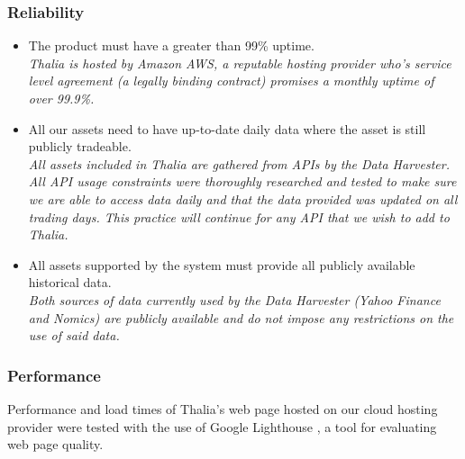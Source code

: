 \documentclass[main.tex]{subfiles}
\begin{document}
\subsubsection{Reliability}
\begin{itemize}
    
    \item The product must have a greater than 99\% uptime.\\
    \textit{Thalia is hosted by Amazon AWS, a reputable hosting provider who’s service level agreement (a legally binding contract) promises a monthly uptime of over 99.9\%\cite{amazonSLA}.}
    
    \item All our assets need to have up-to-date daily data where the asset is still publicly tradeable.\\
    \textit{All assets included in Thalia are gathered from APIs by the Data Harvester. All API usage constraints were thoroughly researched and tested to make sure we are able to access data daily and that the data provided was updated on all trading days. This practice will continue for any API that we wish to add to Thalia.}
    
    \item All assets supported by the system must provide all publicly available historical data.\\
    \textit{Both sources of data currently used by the Data Harvester (Yahoo Finance and Nomics) are publicly available and do not impose any restrictions on the use of said data.}

\end{itemize}

\subsubsection{Performance}
Performance and load times of Thalia's web page hosted on our cloud hosting provider were tested with the use of Google Lighthouse \cite{GoogleLighthouse}, a tool for evaluating web page quality.
\end{document}

